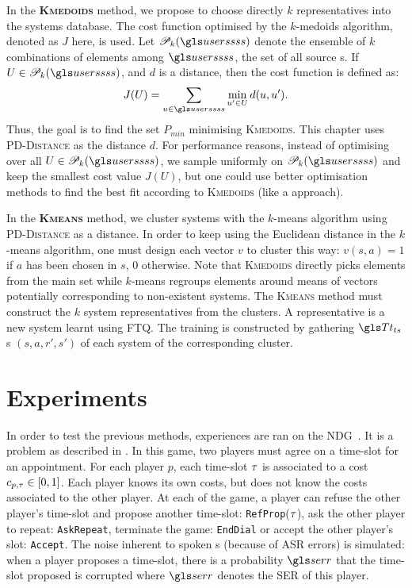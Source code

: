 In the \textbf{\textsc{Kmedoids}} method, we propose to choose directly $k$ representatives into the systems database. The cost function optimised by the $k$-medoids algorithm, denoted as $J$ here, is used. Let $\mathscr{P}_k(\users)$ denote the ensemble of $k$ combinations of elements among $\users$, the set of all source s. If $U\in \mathscr{P}_k(\users)$, and $d$ is a distance, then the cost function is defined as:
\begin{equation}
    J(U)=\sum\limits_{u\in \users}\min\limits_{u'\in U}d(u,u').
\end{equation}
Thus, the goal is to find the set $P_{min}$ minimising \textsc{Kmedoids}. This chapter uses \textsc{PD-Distance} as the distance $d$.
For performance reasons,
%
instead of optimising over all $U\in\mathscr{P}_k(\users)$, we sample uniformly on $\mathscr{P}_k(\users)$ and keep the smallest cost value $J(U)$, but one could use better optimisation methods to find the best fit according to \textsc{Kmedoids} (like a  approach).

In the \textbf{\textsc{Kmeans}} method, we cluster systems with the $k$-means algorithm using \textsc{PD-Distance} as a distance. In order to keep using the Euclidean distance in the $k$-means algorithm, one must design each vector $v$ to cluster this way: $v(s,a) = 1$ if $a$ has been chosen in $s$, 0 otherwise. Note that \textsc{Kmedoids} directly picks elements from the main set while $k$-means regroups elements around means of vectors potentially corresponding to non-existent systems. The \textsc{Kmeans} method must construct the $k$ system representatives from the clusters. A representative is a new system learnt using \gls{FTQ}. The training  is constructed by gathering $\T_{ts}$  s $(s, a, r', s')$ of each system of the corresponding cluster.

\section{Experiments}
\label{section:experiments-sigdial}

In order to test the previous methods, experiences are ran on the \acrfull {NDG}~\parencite{Laroche2016}. It is a  problem as described in . In this game, two players must agree on a time-slot for an appointment. For each player $p$, each time-slot $\tau$ is associated to a cost $c_{p,\tau} \in [0,1]$. Each player knows its own costs, but does not know the costs associated to the other player. At each  of the game, a player can refuse the other player's time-slot and propose another time-slot: \texttt{RefProp}($\tau$), ask the other player to repeat: \texttt{AskRepeat}, terminate the game: \texttt{EndDial} or accept the other player's slot: \texttt{Accept}. The noise inherent to spoken s (because of \acrfull{ASR} errors) is simulated: when a player proposes a time-slot, there is a probability $\ser$ that the time-slot proposed is corrupted where $\ser$ denotes the \gls{SER} of this player.
%


